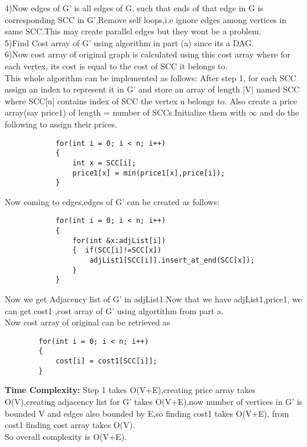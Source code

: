 \documentclass[12pt]{article}
\begin{document}
\begin{enumerate}
\begin{enumerate}
        4)Now edges of G' is all edges of G, such that ends of that edge in G is corresponding SCC in G',Remove self loops,i.e ignore edges among vertices in same SCC.This may create parallel edges but they wont be a problem.\\
        5)Find Cost array of G' using algorithm in part (a) since its a DAG.\\
        6)Now cost array of original graph is calculated using this cost array where for each vertex, its cost is equal to the cost of SCC it belongs to.\\
        This whole algorithm can be implemented as follows:
        After step 1, for each SCC assign an index to represent it in G' and store an array of length |V| named SCC where SCC[u] contains index of SCC the vertex u belongs to.
        Also create a price array(say price1) of length = number of SCCs.Initialize them with $\infty$ and do the following to assign their prices.
        \begin{verbatim}
            for(int i = 0; i < n; i++)
            {
                int x = SCC[i];
                price1[x] = min(price1[x],price[i]);
            }
        \end{verbatim}
        Now coming to edges,edges of G' can be created as follows:
        \begin{verbatim}
            for(int i = 0; i < n; i++)
            {
                for(int &x:adjList[i])
                {  if(SCC[i]!=SCC[x])
                    adjList1[SCC[i]].insert_at_end(SCC[x]);
                }
            }
        \end{verbatim}
        Now we get Adjacency list of G' in adjList1.Now that we have adjList1,price1, we can get cost1 ,cost array of G' using algortithm from part a.\\
        Now cost array of original can be retrieved as
        \begin{verbatim}
        for(int i = 0; i < n; i++)
        {
            cost[i] = cost1[SCC[i]];
        }
        \end{verbatim}
        \textbf{Time Complexity:}
        Step 1 takes O(V+E),creating price array takes O(V),creating adjacency list for G' takes O(V+E),now number of vertices in G' is bounded V and edges also bounded by E,so finding cost1 takes O(V+E), from cost1 finding cost array takes O(V).\\
        So overall complexity is O(V+E).
        
    \end{enumerate}
\end{enumerate}
\end{document}

